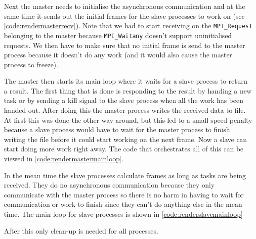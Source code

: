 \documentclass[a4paper]{article}
\begin{document}
\begin{enumerate}[(a)]
	Next the master needs to initialise the asynchronous communication and at the same time it sends out the initial frames for the slave processes to work on (see \autoref{code:rendermasterrecv}). Note that we had to start receiving on the \texttt{MPI\_Request} belonging to the master because \texttt{MPI\_Waitany} doesn't support uninitialised requests. We then have to make sure that no initial frame is send to the master process because it doesn't do any work (and it would also cause the master process to freeze).
	
	
	
	The master then starts its main loop where it waits for a slave process to return a result. The first thing that is done is responding to the result by handing a new task or by sending a kill signal to the slave process when all the work has been handed out. After doing this the master process writes the received data to file. At first this was done the other way around, but this led to a small speed penalty because a slave process would have to wait for the master process to finish writing the file before it could start working on the next frame. Now a slave can start doing more work right away. The code that orchestrates all of this can be viewed in \autoref{code:rendermastermainloop}.
	
	
	
	In the mean time the slave processes calculate frames as long as tasks are being received. They do no asynchronous communication because they only communicate with the master process so there is no harm in having to wait for communication or work to finish since they can't do anything else in the mean time. The main loop for slave processes is shown in \autoref{code:renderslavemainloop}
	
	
	
	After this only clean-up is needed for all processes.
	

\end{enumerate}
\end{document}
